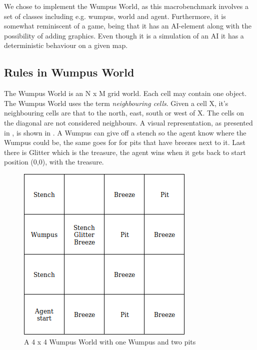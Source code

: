 We chose to implement the Wumpus World, as this macrobenchmark involves a set of classes including e.g. wumpus, world and agent. Furthermore, it is somewhat reminiscent of a game, being that it has an \ac{AI}-element along with the possibility of adding graphics. Even though it is a simulation of an \ac{AI} it has a deterministic behaviour on a given map.

\subsection{Rules in Wumpus World}
The Wumpus World is an N x M grid world. Each cell may contain one object. The Wumpus World uses the term \textit{neighbouring cells}. Given a cell X, it's neighbouring cells are that to the north, east, south or west of X. The cells on the diagonal are not considered neighbours. A visual representation, as presented in \cite{wumpus:world}, is shown in . A Wumpus can give off a stench so the agent know where the Wumpus could be, the same goes for for pits that have breezes next to it. Last there is Glitter which is the treasure, the agent wins when it gets back to start position (0,0), with the treasure.

\begin{figure}
    \centering
    \includegraphics[width=.5\textwidth]{images/wumpus.png}
    \caption{A 4 x 4 Wumpus World with one Wumpus and two pits \cite{wumpus:world}}
    \label{fig:wumpus:world}
\end{figure}

